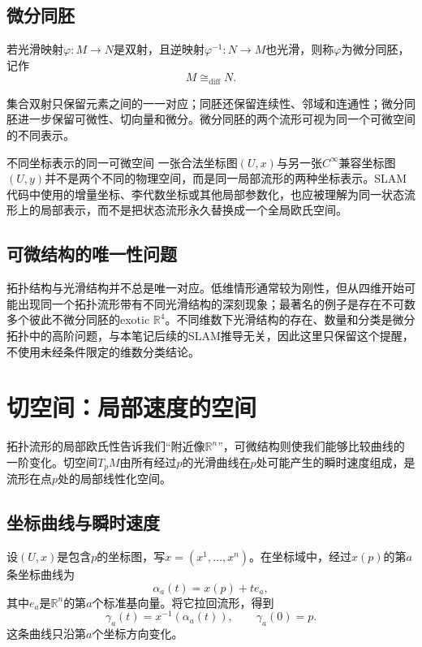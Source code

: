\subsection{微分同胚}

\begin{definition}[微分同胚]
若光滑映射$\varphi:M\to N$是双射，且逆映射$\varphi^{-1}:N\to M$也光滑，则称$\varphi$为微分同胚，记作
\[
    M\cong_{\mathrm{diff}}N.
\]
\end{definition}

集合双射只保留元素之间的一一对应；同胚还保留连续性、邻域和连通性；微分同胚进一步保留可微性、切向量和微分。微分同胚的两个流形可视为同一个可微空间的不同表示。

\begin{slamcase}{不同坐标表示的同一可微空间}
一张合法坐标图$(U,x)$与另一张$C^\infty$兼容坐标图$(U,y)$并不是两个不同的物理空间，而是同一局部流形的两种坐标表示。SLAM代码中使用的增量坐标、李代数坐标或其他局部参数化，也应被理解为同一状态流形上的局部表示，而不是把状态流形永久替换成一个全局欧氏空间。
\end{slamcase}

\subsection{可微结构的唯一性问题}

拓扑结构与光滑结构并不总是唯一对应。低维情形通常较为刚性，但从四维开始可能出现同一个拓扑流形带有不同光滑结构的深刻现象；最著名的例子是存在不可数多个彼此不微分同胚的exotic $\mathbb R^4$。不同维数下光滑结构的存在、数量和分类是微分拓扑中的高阶问题，与本笔记后续的SLAM推导无关，因此这里只保留这个提醒，不使用未经条件限定的维数分类结论。


\section{切空间：局部速度的空间}

拓扑流形的局部欧氏性告诉我们“附近像$\mathbb R^n$”，可微结构则使我们能够比较曲线的一阶变化。切空间$T_pM$由所有经过$p$的光滑曲线在$p$处可能产生的瞬时速度组成，是流形在点$p$处的局部线性化空间。

\subsection{坐标曲线与瞬时速度}

设$(U,x)$是包含$p$的坐标图，写$x=(x^1,\ldots,x^n)$。在坐标域中，经过$x(p)$的第$a$条坐标曲线为
\[
    \alpha_a(t)=x(p)+t e_a,
\]
其中$e_a$是$\mathbb R^n$的第$a$个标准基向量。将它拉回流形，得到
\[
    \gamma_a(t)=x^{-1}(\alpha_a(t)),
    \qquad
    \gamma_a(0)=p.
\]
这条曲线只沿第$a$个坐标方向变化。

